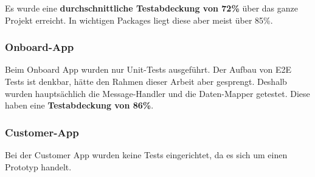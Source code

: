 Es wurde eine \textbf{durchschnittliche Testabdeckung von 72\%} über das ganze Projekt erreicht. In wichtigen Packages liegt diese aber meist über 85\%.

\subsubsection{Onboard-App}

Beim Onboard App wurden nur Unit-Tests ausgeführt. Der Aufbau von E2E Tests ist denkbar, hätte den Rahmen dieser Arbeit aber gesprengt. Deshalb wurden hauptsächlich die Message-Handler und die Daten-Mapper getestet. Diese haben eine \textbf{Testabdeckung von 86\%}.

\subsubsection{Customer-App}

Bei der Customer App wurden keine Tests eingerichtet, da es sich um einen Prototyp handelt.


